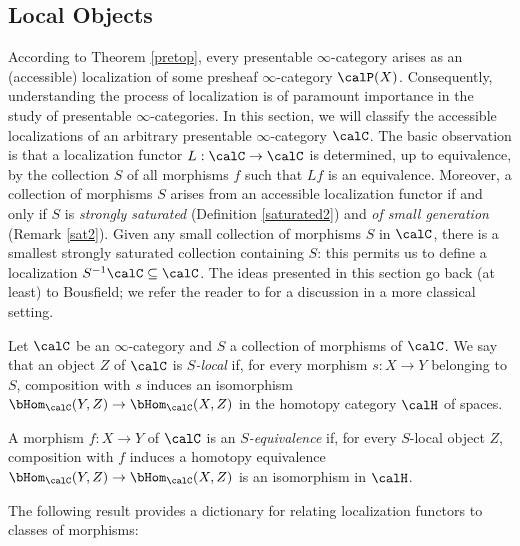 \subsection{Local Objects}\label{invloc}

According to Theorem \ref{pretop}, every presentable $\infty$-category arises as an (accessible) localization of some presheaf $\infty$-category $\calP(X)$. Consequently, understanding the process of localization is of paramount importance in the study of presentable $\infty$-categories. In this section, we will classify the accessible localizations of an arbitrary presentable $\infty$-category $\calC$. The basic observation is that a localization functor $L: \calC \rightarrow \calC$ is determined, up to equivalence, by the collection $S$ of all morphisms $f$ such that $Lf$ is an equivalence. Moreover, a collection of morphisms $S$ arises from an accessible localization functor if and only if $S$ is {\em strongly saturated} (Definition \ref{saturated2}) and {\em of small generation} (Remark \ref{sat2}). Given any small collection of morphisms $S$ in $\calC$, 
there is a smallest strongly saturated collection containing $S$: this permits us to define a localization
$S^{-1} \calC \subseteq \calC$. The ideas presented in this section go back (at least) to Bousfield; we refer the reader to \cite{bousfield} for a discussion in a more classical setting.

\begin{definition}
Let $\calC$ be an $\infty$-category and $S$ a collection of morphisms of $\calC$. We say that
an object $Z$ of $\calC$ is {\it $S$-local} if, for every morphism $s: X \rightarrow Y$ belonging to $S$, composition with $s$ induces an isomorphism
$\bHom_{\calC}(Y,Z) \rightarrow \bHom_{\calC}(X,Z)$
in the homotopy category $\calH$ of spaces.

A morphism $f: X \rightarrow Y$ of $\calC$ is an {\it $S$-equivalence} if, for every $S$-local
object $Z$, composition with $f$ induces a homotopy equivalence
$\bHom_{\calC}(Y,Z) \rightarrow \bHom_{\calC}(X,Z)$
is an isomorphism in $\calH$.
\end{definition}

The following result provides a dictionary for relating localization functors to classes of morphisms:

